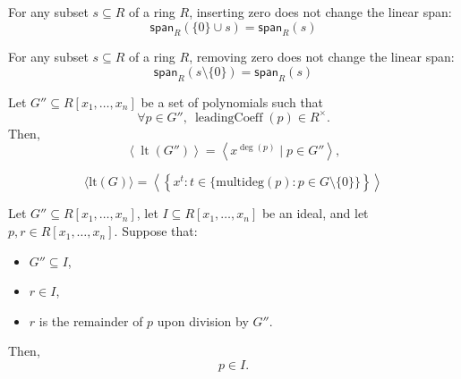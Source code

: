\begin{lemma}\label{span_insert_zero}

  \leanok
  For any subset $s \subseteq R$ of a ring $R$, inserting zero does not change the linear span:
\[
\mathsf{span}_R(\{0\} \cup s) = \mathsf{span}_R(s)
\]

\end{lemma}

\begin{lemma}\label{span_sdiff_singleton_zero}
  \leanok
  For any subset $s \subseteq R$ of a ring $R$, removing zero does not change the linear span:
\[
\mathsf{span}_R(s \setminus \{0\}) = \mathsf{span}_R(s)
\]

\end{lemma}

\begin{lemma}\label{leadingTerm_ideal_span_monomial}
  \leanok
  Let \( G'' \subseteq R[x_1, \dots, x_n] \) be a set of polynomials such that
\[
\forall p \in G'',\ \operatorname{leadingCoeff}(p) \in R^\times.
\]
Then,
\[
\left\langle \operatorname{lt}(G'') \right\rangle = \left\langle x^{\deg(p)} \mid p \in G'' \right\rangle,
\]

\end{lemma}

\begin{lemma}\label{leadingTerm_ideal_span_monomial'}
  \leanok
  \[
\langle \mathrm{lt}(G) \rangle = \left\langle \left\{ x^t : t \in \{ \mathrm{multideg}(p) : p \in G \setminus \{0\} \} \right\} \right\rangle
\]

\end{lemma}

\begin{lemma}\label{mem_ideal_of_remainder_mem_ideal}
  \leanok
  Let \( G'' \subseteq R[x_1, \dots, x_n] \), let \( I \subseteq R[x_1, \dots, x_n] \) be an ideal,
and let \( p, r \in R[x_1, \dots, x_n] \). Suppose that:
\begin{itemize}
\item \( G'' \subseteq I \),
\item \( r \in I \),
\item \( r \) is the remainder of \( p \) upon division by \( G'' \).
\end{itemize}
Then,
\[
p \in I.
\]

\end{lemma}

